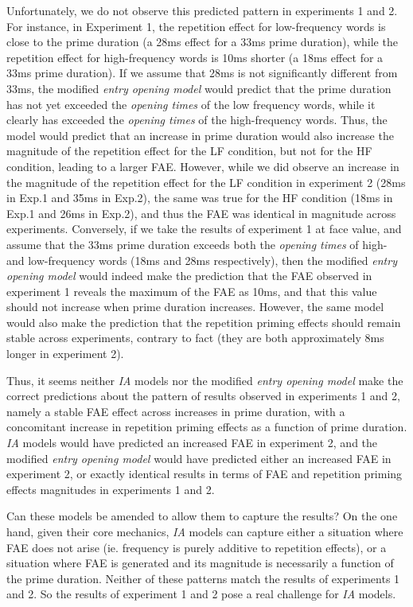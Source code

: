 \documentclass[
]{interact}
\begin{document}
Unfortunately, we do not observe this predicted pattern in experiments 1
and 2. For instance, in Experiment 1, the repetition effect for
low-frequency words is close to the prime duration (a 28ms effect for a
33ms prime duration), while the repetition effect for high-frequency
words is 10ms shorter (a 18ms effect for a 33ms prime duration). If we
assume that 28ms is not significantly different from 33ms, the modified
\emph{entry opening model} would predict that the prime duration has not
yet exceeded the \emph{opening times} of the low frequency words, while
it clearly has exceeded the \emph{opening times} of the high-frequency
words. Thus, the model would predict that an increase in prime duration
would also increase the magnitude of the repetition effect for the LF
condition, but not for the HF condition, leading to a larger FAE.
However, while we did observe an increase in the magnitude of the
repetition effect for the LF condition in experiment 2 (28ms in Exp.1
and 35ms in Exp.2), the same was true for the HF condition (18ms in
Exp.1 and 26ms in Exp.2), and thus the FAE was identical in magnitude
across experiments. Conversely, if we take the results of experiment 1
at face value, and assume that the 33ms prime duration exceeds both the
\emph{opening times} of high- and low-frequency words (18ms and 28ms
respectively), then the modified \emph{entry opening model} would indeed
make the prediction that the FAE observed in experiment 1 reveals the
maximum of the FAE as 10ms, and that this value should not increase when
prime duration increases. However, the same model would also make the
prediction that the repetition priming effects should remain stable
across experiments, contrary to fact (they are both approximately 8ms
longer in experiment 2).

Thus, it seems neither \emph{IA} models nor the modified \emph{entry
opening model} make the correct predictions about the pattern of results
observed in experiments 1 and 2, namely a stable FAE effect across
increases in prime duration, with a concomitant increase in repetition
priming effects as a function of prime duration. \emph{IA} models would
have predicted an increased FAE in experiment 2, and the modified
\emph{entry opening model} would have predicted either an increased FAE
in experiment 2, or exactly identical results in terms of FAE and
repetition priming effects magnitudes in experiments 1 and 2.

Can these models be amended to allow them to capture the results? On the
one hand, given their core mechanics, \emph{IA} models can capture
either a situation where FAE does not arise (ie. frequency is purely
additive to repetition effects), or a situation where FAE is generated
and its magnitude is necessarily a function of the prime duration.
Neither of these patterns match the results of experiments 1 and 2. So
the results of experiment 1 and 2 pose a real challenge for \emph{IA}
models.
\end{document}
